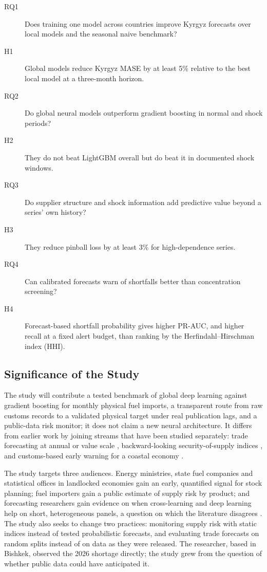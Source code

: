 \documentclass[conference]{IEEEtran}
\begin{document}
\begin{description}
\item[RQ1] Does training one model across countries improve Kyrgyz forecasts over local models and the seasonal naive benchmark?
\item[H1] Global models reduce Kyrgyz MASE by at least 5\% relative to the best local model at a three-month horizon.
\item[RQ2] Do global neural models outperform gradient boosting in normal and shock periods?
\item[H2] They do not beat LightGBM overall but do beat it in documented shock windows.
\item[RQ3] Do supplier structure and shock information add predictive value beyond a series' own history?
\item[H3] They reduce pinball loss by at least 3\% for high-dependence series.
\item[RQ4] Can calibrated forecasts warn of shortfalls better than concentration screening?
\item[H4] Forecast-based shortfall probability gives higher PR-AUC, and higher recall at a fixed alert budget, than ranking by the Herfindahl--Hirschman index (HHI).
\end{description}

\subsection{Significance of the Study}
The study will contribute a tested benchmark of global deep learning against gradient boosting for monthly physical fuel imports, a transparent route from raw customs records to a validated physical target under real publication lags, and a public-data risk monitor; it does not claim a new neural architecture. It differs from earlier work by joining streams that have been studied separately: trade forecasting at annual or value scale \cite{sellami2024}, backward-looking security-of-supply indices \cite{cohen2011}, and customs-based early warning for a coastal economy \cite{kwon2026}.

The study targets three audiences. Energy ministries, state fuel companies and statistical offices in landlocked economies gain an early, quantified signal for stock planning; fuel importers gain a public estimate of supply risk by product; and forecasting researchers gain evidence on when cross-learning and deep learning help on short, heterogeneous panels, a question on which the literature disagrees \cite{montero2021,yolusever2026}. The study also seeks to change two practices: monitoring supply risk with static indices instead of tested probabilistic forecasts, and evaluating trade forecasts on random splits instead of on data as they were released. The researcher, based in Bishkek, observed the 2026 shortage directly; the study grew from the question of whether public data could have anticipated it.
\end{document}
